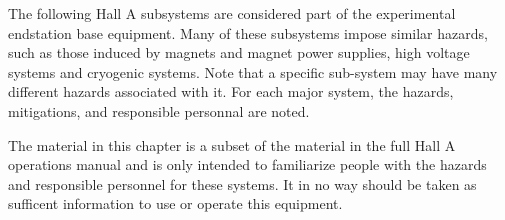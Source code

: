         The following Hall A subsystems are considered part of the experimental endstation base equipment.
Many of these subsystems impose similar hazards, such as those induced by magnets and magnet power supplies,
high voltage systems and cryogenic systems.  Note that a specific sub-system may have many different hazards associated with it.
For each major system, the hazards, mitigations, and responsible personnal are noted.

The material in this chapter is a subset of the material in the full Hall A operations manual and is only intended to familiarize
people with the hazards and responsible personnel for these systems.  It in no way should be taken as sufficent information to
use or operate this equipment.

%
%

